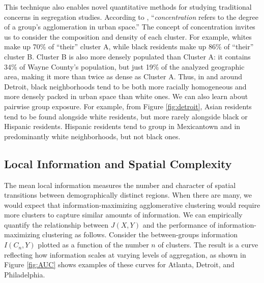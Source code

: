 \documentclass[9pt,twocolumn,twoside]{pnas-new}
\begin{document}
	This technique also enables novel quantitative methods for studying traditional concerns in segregation studies. According to \cite{Massey1988}, ``\emph{concentration} refers to the degree of a group's agglomeration in urban space.'' The concept of concentration invites us to consider the composition and density of each cluster. For example, whites make up 70\% of ``their'' cluster A, while black residents make up 86\% of ``their'' cluster B. Cluster B is also more densely populated than Cluster A: it contains 34\% of Wayne County's population, but just 19\% of the analyzed geographic area, making it more than twice as dense as Cluster A. Thus, in and around Detroit, black neighborhoods tend to be both more racially homogeneous and more densely packed in urban space than white ones. We can also learn about pairwise group exposure. For example, from Figure  \ref{fig:detroit}, Asian residents tend to be found alongside white residents, but more rarely alongside black or Hispanic residents. Hispanic residents tend to group in Mexicantown and in predominantly white neighborhoods, but not black ones.

\subsection*{Local Information and Spatial Complexity}
	The mean local information measures the number and character of spatial transitions between demographically distinct regions. When there are many, we would expect that information-maximizing agglomerative clustering would require more clusters to capture similar amounts of information. We can empirically quantify the relationship between $J(X,Y)$ and the performance of information-maximizing clustering as follows. Consider the between-groups information $I(C_n,Y)$ plotted as a function of the number $n$ of clusters. The result is a curve reflecting how information scales at varying levels of aggregation, as shown in Figure \ref{fig:AUC} shows examples of these curves for Atlanta, Detroit, and Philadelphia. 
\end{document}
